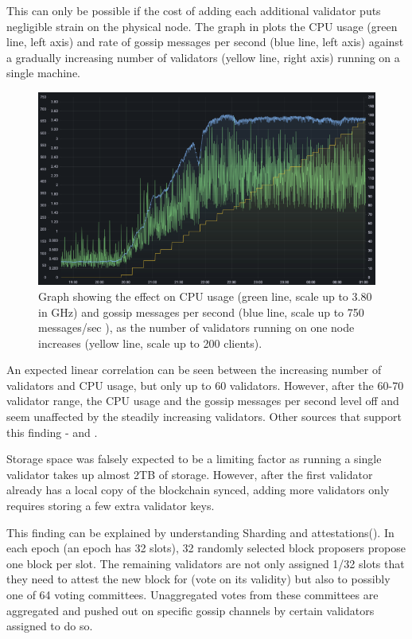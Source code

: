 This can only be possible if the cost of adding each additional validator puts negligible strain on the physical node. The graph in  \cite{Sutton2022ExploringSymphonious} plots the CPU usage (green line, left axis) and rate of gossip messages per second (blue line, left axis) against a gradually increasing number of validators (yellow line, right axis) running on a single machine.

\begin{figure}[htb!]
    \centering
    \includegraphics[width=15cm,center]{Figures/cpuValidatorsGossip.png}
    \caption{Graph showing the effect on CPU usage (green line, scale up to 3.80 in GHz) and gossip messages per second (blue line, scale up to 750 messages/sec ), as the number of validators running on one node increases (yellow line, scale up to 200 clients). \cite{Sutton2022ExploringSymphonious}}
    \label{Figure:validatorIncrease}
\end{figure}

An expected linear correlation can be seen between the increasing number of validators and CPU usage, but only up to 60 validators. However, after the 60-70 validator range, the CPU usage and the gossip messages per second level off and seem unaffected by the steadily increasing validators. Other sources that support  this finding - \cite{Roy2022StakingExchange} and \cite{2021HardwareEthstaker}.

Storage space was falsely expected to be a limiting factor as running a single validator takes up almost 2TB of storage. However, after the first validator already has a local copy of the blockchain synced, adding more validators only requires storing a few extra validator keys.

This finding can be explained by understanding Sharding and attestations(). In each epoch (an epoch has 32 slots), 32 randomly selected block proposers propose one block per slot. The remaining validators are not only assigned 1/32 slots that they need to attest the new block for (vote on its validity) but also to possibly one of 64 voting committees. Unaggregated votes from these committees are aggregated and pushed out on specific gossip channels by certain validators assigned to do so. 


